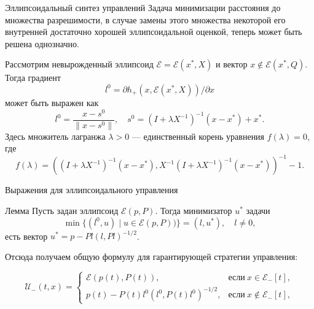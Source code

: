 \documentclass{beamer}
\begin{document}
\begin{frame}{Эллипсоидальный синтез управлений}
    Задача минимизации расстояния до множества разрешимости, в случае замены этого множества некоторой его внутренней достаточно хорошей эллипсоидальной оценкой, теперь может быть решена однозначно.

    Рассмотрим невырожденный эллипсоид \( \mathcal{E} = \mathcal{E}(x^*, X) \) и вектор \( x \notin 
     \mathcal{E}(x^*, Q). \) Тогда градиент
    \begin{equation*}
        l^0 = \partial h_+(x, \mathcal{E}(x^*, X)) / \partial x
    \end{equation*}
    может быть выражен как 
    \begin{equation*}
        l^0 = \frac{x - s^0}{\| x - s^0 \|}, \quad s^0 = (I + \lambda X^{-1})^{-1}(x - x^*) + x^*.
    \end{equation*}
    Здесь множитель лагранжа \( \lambda > 0 \) --- единственный корень уравнения \( f(\lambda) = 0 \),
    где
    \begin{equation*}
        f(\lambda) = ((I + \lambda X^{-1})^{-1}(x - x^*), X^{-1}(I + \lambda X^{-1})^{-1}(x - x^*))^{-1} - 1.
    \end{equation*}

\end{frame}

\begin{frame}{Выражения для эллипсоидального управления}
\begin{block}{Лемма}
    Пусть задан эллипсоид \( \mathcal{E}(p, P) \). Тогда минимизатор \( u^* \) задачи
    \begin{equation*}
        \min\{ (l^0, u) \mid u \in \mathcal{E}(p, P)) \} = (l, u^*), \quad l \ne 0, 
    \end{equation*}
    есть вектор \( u^* = p - Pl(l, Pl)^{-1/2} \).
\end{block}
Отсюда получаем общую формулу для гарантирующей стратегии управления:

\begin{equation*}
    \mathcal{U}_-(t,x) = 
     \begin{cases}
        \mathcal{E}(p(t), P(t)), & \text{если} \ x \in \mathcal{E}_-[t], \\
        p(t) - P(t)l^0(l^0, P(t)l^0)^{-1/2}, & \text{если} \ x \notin \mathcal{E}_-[t],
     \end{cases}
\end{equation*}

\end{frame}
\end{document}
